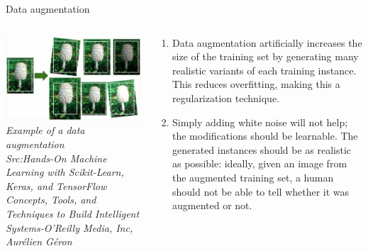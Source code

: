 \begin{frame}{Data augmentation}
	\begin{columns}[T]
        \begin{column}{0.4\textwidth}
        	\includegraphics[width=\textwidth]{images/Data Aug.png}
			\tiny{\textit{Example of a data augmentation\\ Src:Hands-On Machine Learning with Scikit-Learn, Keras, and TensorFlow  Concepts, Tools, and Techniques to Build Intelligent Systems-O'Reilly Media, Inc, Aurélien Géron}}
        \end{column}
		\begin{column}{0.6\textwidth}
			\begin{enumerate}[$\bullet$]
				\item Data augmentation artificially increases the size of the training set by
				generating many realistic variants of each training instance. This reduces
				overfitting, making this a regularization technique.\pause
				\item Simply adding white noise will not help; the
				modifications should be learnable. The generated
				instances should be as realistic as possible: ideally, given an image from
				the augmented training set, a human should not be able to tell whether it
				was augmented or not.
			\end{enumerate}
		\end{column} 
    \end{columns}
\end{frame}

